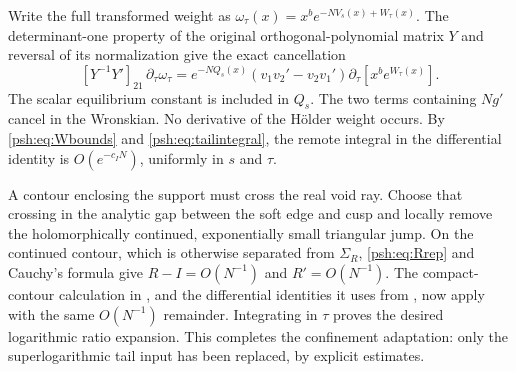 \documentclass[11pt,a4paper]{article}
\numberwithin{equation}{section}
\theoremstyle{remark}\newtheorem{remark}[theorem]{Remark}
\begin{document}
Write the full transformed weight as
$\omega_\tau(x)=x^b e^{-NV_s(x)+W_\tau(x)}$.
The determinant-one property of the original orthogonal-polynomial
matrix $Y$ and reversal of its normalization give the exact cancellation
\begin{equation}\label{psh:eq:wronskian}
 [Y^{-1}Y']_{21}\,\partial_\tau\omega_\tau
 =e^{-NQ_s(x)}(v_1v_2'-v_2v_1')
                  \partial_\tau[x^b e^{W_\tau(x)}].
\end{equation}
The scalar equilibrium constant is included in $Q_s$. The two terms
containing $Ng'$ cancel in the Wronskian. No derivative of the H\"older
weight occurs. By \eqref{psh:eq:Wbounds} and \eqref{psh:eq:tailintegral}, the
remote integral in the differential identity is $O(e^{-c_IN})$, uniformly
in $s$ and $\tau$.

A contour enclosing the support must cross the real void ray. Choose
that crossing in the analytic gap between the soft edge and cusp and
locally remove the holomorphically continued, exponentially small
triangular jump. On the continued contour, which is otherwise separated
from $\Sigma_R$, \eqref{psh:eq:Rrep} and Cauchy's formula give
$R-I=O(N^{-1})$ and $R'=O(N^{-1})$. The compact-contour calculation in
\cite[Proposition 9.1]{psh-cg}, and the differential identities it uses from
\cite[(6.3)--(6.6)]{psh-charlier}, now apply with the same $O(N^{-1})$
remainder. Integrating in $\tau$ proves the desired logarithmic ratio
expansion. This completes the confinement adaptation: only the
superlogarithmic tail input has been replaced, by explicit estimates.
\end{document}
